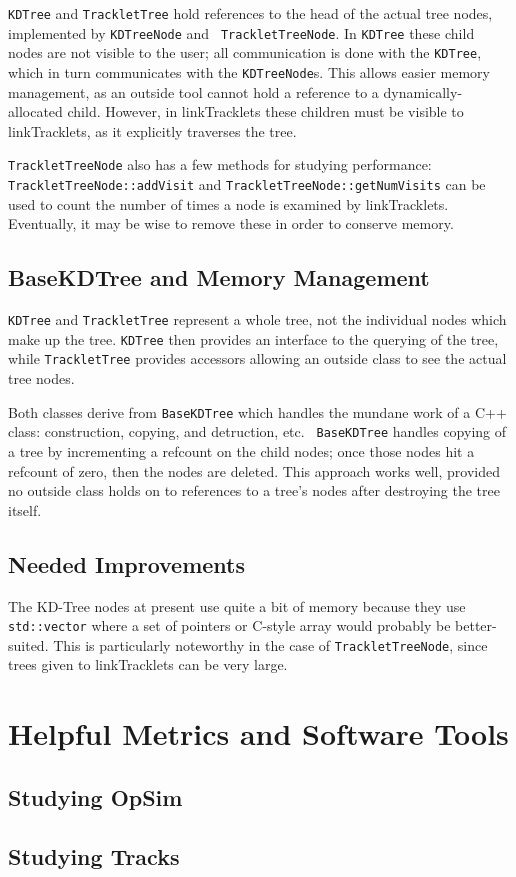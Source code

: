 {\tt KDTree} and {\tt TrackletTree} hold references to the head of the
actual tree nodes, implemented by {\tt KDTreeNode} and {\tt
TrackletTreeNode}.  In {\tt KDTree} these child nodes are not visible
to the user; all communication is done with the {\tt KDTree}, which in
turn communicates with the {\tt KDTreeNode}s.  This allows easier
memory management, as an outside tool cannot hold a reference to a
dynamically-allocated child.  However, in linkTracklets these children
must be visible to linkTracklets, as it explicitly traverses the tree.  

{\tt TrackletTreeNode} also has a few methods for studying performance:
{\tt TrackletTreeNode::addVisit} and {\tt TrackletTreeNode::getNumVisits} can
be used to count the number of times a node is examined by
linkTracklets.  Eventually, it may be wise to remove these in order to
conserve memory.


\subsection{BaseKDTree and Memory Management}

{\tt KDTree} and {\tt TrackletTree} represent a whole tree, not the
individual nodes which make up the tree.  {\tt KDTree} then provides
an interface to the querying of the tree, while {\tt TrackletTree}
provides accessors allowing an outside class to see the actual tree
nodes.  

Both classes derive from {\tt BaseKDTree} which handles the mundane
work of a C++ class: construction, copying, and detruction, etc. {\tt
BaseKDTree} handles copying of a tree by incrementing a refcount on
the child nodes; once those nodes hit a refcount of zero, then the
nodes are deleted.  This approach works well, provided no outside
class holds on to references to a tree's nodes after destroying the
tree itself.




\subsection{Needed Improvements}
The KD-Tree nodes at present use quite a bit of memory because they
use {\tt std::vector} where a set of pointers or C-style array would
probably be better-suited.  This is particularly noteworthy in the
case of {\tt TrackletTreeNode}, since trees given to linkTracklets can
be very large.



\section{Helpful Metrics and Software Tools}
\subsection{Studying OpSim}
\subsection{Studying Tracks}

